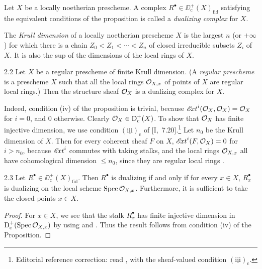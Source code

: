 \begin{definition*}
Let $X$ be a locally noetherian prescheme. A complex $R^\bullet\in\DD^+_{\mathrm{c}}(X)_{\mathrm{fid}}$ satisfying the equivalent conditions of the proposition is called a \emph{dualizing complex} for $X$.
\end{definition*}

\begin{definition*}
The \emph{Krull dimension} of a locally noetherian prescheme $X$ is the largest $n$ (or $+\infty$) for which there is a chain $Z_0<Z_1<\cdots<Z_n$ of closed irreducible subsets $Z_i$ of $X$. It is also the sup of the dimensions of the local rings of $X$.
\end{definition*}

\begin{bookexample}{2.2}\label{ex:5.2.2}
Let $X$ be a regular prescheme of finite Krull dimension. (A \emph{regular prescheme} is a prescheme $X$ such that all the local rings $\mathcal{O}_{X,x}$ of points of $X$ are regular local rings.) Then the structure sheaf $\mathcal{O}_X$ is a dualizing complex for $X$.

Indeed, condition (iv) of the proposition is trivial, because $\mathop{\mathscr{E}\!xt}\nolimits^{i}(\mathcal{O}_X,\mathcal{O}_X)=\mathcal{O}_X$ for $i=0$, and $0$ otherwise. Clearly $\mathcal{O}_X\in\operatorname{D}_{\mathrm{c}}^{+}(X)$. To show that $\mathcal{O}_X$ has finite injective dimension, we use condition $(\underline{\mathrm{iii}})_{\mathrm{c}}$ of [I,~7.20].\footnote{Editorial reference correction: read , with the sheaf-valued condition $(\underline{\mathrm{iii}})_{\mathrm{c}}$.} Let $n_0$ be the Krull dimension of $X$. Then for every coherent sheaf $F$ on $X$, $\mathop{\mathscr{E}\!xt}\nolimits^{i}(F,\mathcal{O}_X)=0$ for $i>n_0$, because $\mathop{\mathscr{E}\!xt}\nolimits^{i}$ commutes with taking stalks, and the local rings $\mathcal{O}_{X,x}$ all have cohomological dimension $\leq n_0$, since they are regular local rings \cite[\nopp (28.2)]{14}.
\end{bookexample}

\begin{bookcorollary}{2.3}\label{cor:5.2.3}
Let $R^\bullet\in\DD_{\mathrm{c}}^+(X)_{\mathrm{fid}}$. Then $R^\bullet$ is dualizing if and only if for every $x\in X$, $R_x^\bullet$ is dualizing on the local scheme $\operatorname{Spec}\mathcal{O}_{X,x}$. Furthermore, it is sufficient to take the closed points $x\in X$.
\end{bookcorollary}

\begin{proof}
For $x\in X$, we see that the stalk $R_x^\bullet$ has finite injective dimension in $\operatorname{D}^+_{\mathrm{c}}(\operatorname{Spec}\mathcal{O}_{X,x})$ by using  and . Thus the result follows from condition (iv) of the Proposition.
\end{proof}

